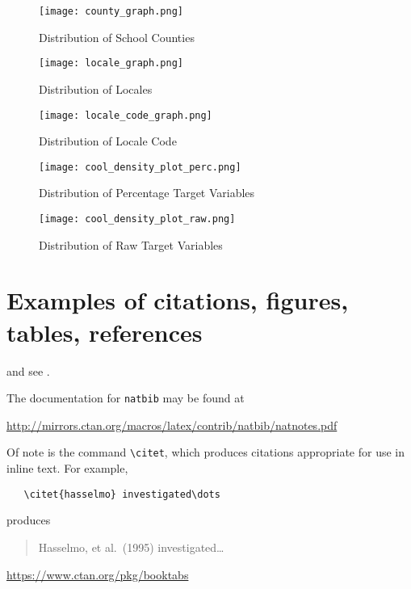 \documentclass[12pt]{article}
\begin{document}
\begin{figure}[!htb]
  \centering
  \texttt{[image: county\_graph.png]}
  \caption{Distribution of School Counties}
  \label{fig:county}
\end{figure}

\begin{figure}[!htb]
  \centering
  \texttt{[image: locale\_graph.png]}
  \caption{Distribution of Locales}
  \label{fig:locale}
\end{figure}

\begin{figure}[!htb]
  \centering
  \texttt{[image: locale\_code\_graph.png]}
  \caption{Distribution of Locale Code}
  \label{fig:charter}
\end{figure}

\begin{figure}[!htb]
  \centering
  \texttt{[image: cool\_density\_plot\_perc.png]}
  \caption{Distribution of Percentage Target Variables}
  \label{fig:target_perc}
\end{figure}

\begin{figure}[!htb]
  \centering
  \texttt{[image: cool\_density\_plot\_raw.png]}
  \caption{Distribution of Raw Target Variables}
  \label{fig:target_raw}
\end{figure}

\section{Examples of citations, figures, tables, references}
\label{sec:others}
\lipsum[8] \cite{kour2014real,kour2014fast} and see \cite{hadash2018estimate}.

The documentation for \verb+natbib+ may be found at
\begin{center}
  \url{http://mirrors.ctan.org/macros/latex/contrib/natbib/natnotes.pdf}
\end{center}
Of note is the command \verb+\citet+, which produces citations
appropriate for use in inline text.  For example,
\begin{verbatim}
   \citet{hasselmo} investigated\dots
\end{verbatim}
produces
\begin{quote}
  Hasselmo, et al.\ (1995) investigated\dots
\end{quote}

\begin{center}
  \url{https://www.ctan.org/pkg/booktabs}
\end{center}
\end{document}

